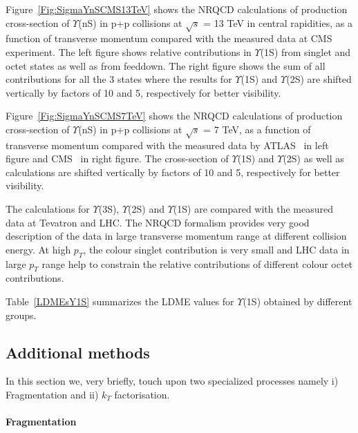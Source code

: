 Figure~\ref{Fig:SigmaYnSCMS13TeV} shows the NRQCD calculations of production cross-section
of $\Upsilon$(nS)
      in p+p collisions at $\sqrt{s}$ = 13 TeV in central rapidities, as a function of
      transverse momentum compared with the measured data at CMS~\cite{CMS:2017dju}
      experiment. The left figure shows relative contributions in $\Upsilon$(1S) from
      singlet and octet states as well as from feeddown. The right figure shows the sum
      of all contributions for all the 3 states where the results for $\Upsilon$(1S) and
      $\Upsilon$(2S) are shifted vertically by factors  of 10 and 5, respectively
      for better visibility.


      Figure~\ref{Fig:SigmaYnSCMS7TeV} shows the NRQCD calculations of production cross-section
      of $\Upsilon$(nS) in
      p+p collisions at $\sqrt{s}$ = 7 TeV, as a function of transverse momentum compared with
      the measured data by ATLAS~\cite{ATLAS:2012lmu} in left figure and CMS~\cite{CMS:2013qur}
      in right figure. The cross-section of $\Upsilon$(1S) and $\Upsilon$(2S) as well as
      calculations are shifted vertically by factors  of 10 and 5, respectively for better visibility.

      The calculations for  $\Upsilon$(3S), $\Upsilon$(2S) and $\Upsilon$(1S) are compared with 
      the measured data at Tevatron and LHC. The NRQCD formalism provides  very good description
      of the data in 
large transverse momentum range at different collision energy. 
   At high $p_T$, the colour singlet contribution is very small and LHC data in large $p_T$ range 
 help to constrain the relative contributions of different colour octet contributions.
  
Table~\ref{LDMEsY1S} summarizes the LDME values for $\Upsilon$(1S) obtained by 
different groups.







\subsection{Additional methods}

In this section we, very briefly, touch upon two specialized processes namely
i) Fragmentation and ii) $k_T$ factorisation. 

\paragraph{Fragmentation}

